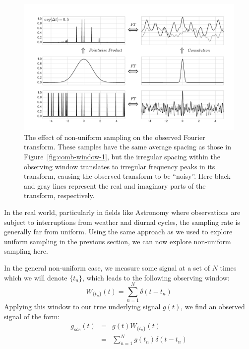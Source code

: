 \documentclass[preprint]{aastex}
\newcommand{\fig}[1]{Figure~\ref{fig:#1}}
\newcommand{\figlabel}[1]{\label{fig:#1}}
\newcommand{\eqlabel}[1]{\label{eq:#1}}
\begin{document}
\begin{figure}[ht]
  \centering
  \includegraphics[width=\textwidth]{fig10_random_window}
  \caption{The effect of non-uniform sampling on the observed Fourier transform.
    These samples have the same average spacing as those in \fig{comb-window-1},
    but the irregular spacing within the observing window translates to 
    irregular frequency peaks in its transform,
    causing the observed transform to be ``noisy''.
    Here black and gray lines represent the real and imaginary parts of the
    transform, respectively.
    \figlabel{random-window}}
\end{figure}

In the real world, particularly in fields like Astronomy where observations are
subject to interruptions from weather and diurnal cycles, the sampling rate
is generally far from uniform.
Using the same approach as we used to explore uniform sampling in the previous
section, we can now explore non-uniform sampling here.

In the general non-uniform case, we measure some signal at a set of $N$ times
which we will denote $\{t_n\}$, which leads to the following observing window:
\begin{equation}
  W_{\{t_n\}}(t) = \sum_{n=1}^{N} \delta(t - t_n)
  \eqlabel{nonuniform-window}
\end{equation}
Applying this window to our true underlying signal $g(t)$, we find an observed
signal of the form:
\begin{eqnarray}
  g_{obs}(t) &=& g(t) W_{\{t_n\}}(t) \nonumber\\
             &=& \sum_{n=1}^{N} g(t_n)\delta(t - t_n)
  \eqlabel{g-nonuniform}
\end{eqnarray}
\end{document}
